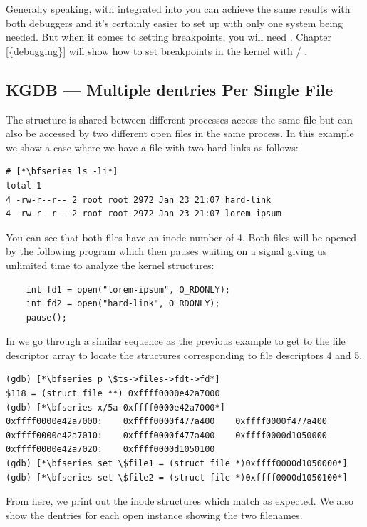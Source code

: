 \noindent
Generally speaking, with  integrated into  you can achieve the same results with both debuggers and it's certainly easier to set up  with only one system being needed. But when it comes to setting breakpoints, you will need . Chapter \ref{{debugging}} will show how to set breakpoints in the kernel with  / .

\subsection{KGDB --- Multiple dentries Per Single File}

The  structure is shared between different processes access the same file but can also be accessed by two different open files in the same process. In this example we show a case where we have a file with two hard links as follows:

\begin{lstlisting}
# [*\bfseries ls -li*]
total 1
4 -rw-r--r-- 2 root root 2972 Jan 23 21:07 hard-link
4 -rw-r--r-- 2 root root 2972 Jan 23 21:07 lorem-ipsum
\end{lstlisting}

\noindent
You can see that both files have an inode number of 4. Both files will be opened by the following program which then pauses waiting on a signal giving us unlimited time to analyze the kernel structures:

\begin{lstlisting}
    int fd1 = open("lorem-ipsum", O_RDONLY);
    int fd2 = open("hard-link", O_RDONLY);
    pause();
\end{lstlisting}

\noindent
In  we go through a similar sequence as the previous example to get to the file descriptor array to locate the  structures corresponding to file descriptors 4 and 5.

\begin{lstlisting}
(gdb) [*\bfseries p \$ts->files->fdt->fd*]
$118 = (struct file **) 0xffff0000e42a7000
(gdb) [*\bfseries x/5a 0xffff0000e42a7000*]
0xffff0000e42a7000:    0xffff0000f477a400    0xffff0000f477a400
0xffff0000e42a7010:    0xffff0000f477a400    0xffff0000d1050000
0xffff0000e42a7020:    0xffff0000d1050100
(gdb) [*\bfseries set \$file1 = (struct file *)0xffff0000d1050000*]
(gdb) [*\bfseries set \$file2 = (struct file *)0xffff0000d1050100*]
\end{lstlisting}

\noindent
From here, we print out the inode structures which match as expected. We also show the dentries for each open instance showing the two filenames.


